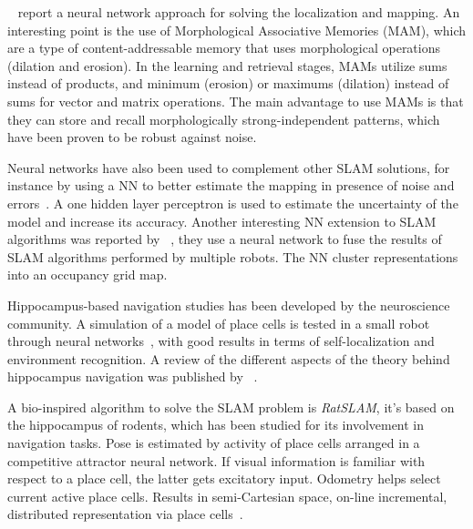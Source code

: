 \citeauthor{villaverde2006morphological}~\cite{villaverde2006morphological} report a neural network approach for solving the localization and mapping. An interesting point is the use of Morphological Associative Memories (MAM), which are a type of content-addressable memory that uses morphological operations (dilation and erosion). In the learning and retrieval stages, MAMs utilize sums instead of products, and minimum (erosion) or maximums (dilation) instead of sums for vector and matrix operations. The main advantage to use MAMs is that they can store and recall morphologically strong-independent patterns, which have been proven to be robust against noise. 

Neural networks have also been used to complement other SLAM solutions, for instance by using a NN to better estimate the mapping in presence of noise and errors~\cite{choi2007neural}. A one hidden layer perceptron is used to estimate the uncertainty of the model and increase its accuracy. Another interesting NN extension to SLAM algorithms was reported by \citeauthor{saeedi2011neural}~\cite{saeedi2011neural}, they use a neural network to fuse the results of SLAM algorithms performed by multiple robots. The NN cluster representations into an occupancy grid map.

Hippocampus-based navigation studies has been developed by the neuroscience community. A simulation of a model of place cells is tested in a small robot through neural networks~\cite{burgess1997robotic}, with good results in terms of self-localization and environment recognition. A review of the different aspects of the theory behind hippocampus navigation was published by \citeauthor{sunderhauf2010learning}~\cite{sunderhauf2010learning}. 

A bio-inspired algorithm to solve the SLAM problem is \emph{RatSLAM}, it's based on the hippocampus of rodents, which has been studied for its involvement in navigation tasks. Pose is estimated by activity of place cells arranged in a competitive attractor neural network. If visual information is familiar with respect to a place cell, the latter gets excitatory input. Odometry helps select current active place cells. Results in semi-Cartesian space, on-line incremental, distributed representation via place cells~\cite{rat-slam,milford2008robot}.